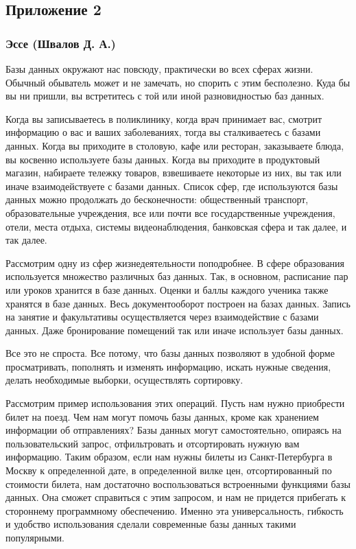 \documentclass[a4paper,14pt]{extarticle}
\begin{document}
\newpage

\subsection*{\hfill Приложение 2}

\subsubsection*{\centering Эссе (Швалов Д. А.)}

Базы данных окружают нас повсюду, практически во всех сферах жизни. Обычный обыватель может и не замечать, но спорить с этим бесполезно. Куда бы вы ни пришли, вы встретитесь с той или иной разновидностью баз данных.

Когда вы записываетесь в поликлинику, когда врач принимает вас, смотрит информацию о вас и ваших заболеваниях, тогда вы сталкиваетесь с базами данных. Когда вы приходите в столовую, кафе или ресторан, заказываете блюда, вы косвенно используете базы данных. Когда вы приходите в продуктовый магазин, набираете тележку товаров, взвешиваете некоторые из них, вы так или иначе взаимодействуете с базами данных. Список сфер, где используются базы данных можно продолжать до бесконечности: общественный транспорт, образовательные учреждения, все или почти все государственные учреждения, отели, места отдыха, системы видеонаблюдения, банковская сфера и так далее, и так далее.

Рассмотрим одну из сфер жизнедеятельности поподробнее. В сфере образования используется множество различных баз данных. Так, в основном, расписание пар или уроков хранится в базе данных. Оценки и баллы каждого ученика также хранятся в базе данных. Весь документооборот построен на базах данных. Запись на занятие и факультативы осуществляется через взаимодействие с базами данных. Даже бронирование помещений так или иначе использует базы данных.

Все это не спроста. Все потому, что базы данных позволяют в удобной форме просматривать, пополнять и изменять информацию, искать нужные сведения, делать необходимые выборки, осуществлять сортировку.

Рассмотрим пример использования этих операций. Пусть нам нужно приобрести билет на поезд. Чем нам могут помочь базы данных, кроме как хранением информации об отправлениях? Базы данных могут самостоятельно, опираясь на пользовательский запрос, отфильтровать и отсортировать нужную вам информацию. Таким образом, если нам нужны билеты из Санкт-Петербурга в Москву к определенной дате, в определенной вилке цен, отсортированный по стоимости билета, нам достаточно воспользоваться встроенными функциями базы данных. Она сможет справиться с этим запросом, и нам не придется прибегать к стороннему программному обеспечению. Именно эта универсальность, гибкость и удобство использования сделали современные базы данных такими популярными.
\end{document}
